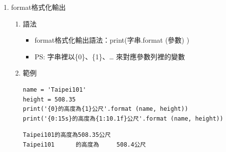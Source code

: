 \documentclass[a4paper,12pt]{article}
\begin{document}
\begin{enumerate}
\begin{enumerate}
\begin{lstlisting}
\end{lstlisting}

\begin{verbatim}
台北101的高度為508公尺，參觀門票為18.24美金.
\end{verbatim}
\end{enumerate}

\item format格式化輸出
\label{sec:orgf711221}
\begin{enumerate}
\item 語法
\label{sec:org21f2e89}
\begin{itemize}
\item format格式化輸出語法：print(字串.format (參數) ) \\
\item PS: 字串裡以\{0\}、\{1\}、\ldots{} 來對應參數列裡的變數\\
\end{itemize}
\item 範例
\label{sec:orgc8c06d3}
\lstset{breaklines=true,language=Python,label= ,caption= ,captionpos=b,firstnumber=1,numbers=left}
\begin{lstlisting}
name = 'Taipei101'
height = 508.35
print('{0}的高度為{1}公尺'.format (name, height))
print('{0:15s}的高度為{1:10.1f}公尺'.format (name, height))
\end{lstlisting}

\begin{verbatim}
Taipei101的高度為508.35公尺
Taipei101      的高度為     508.4公尺
\end{verbatim}
\end{enumerate}
\end{enumerate}
\end{document}
